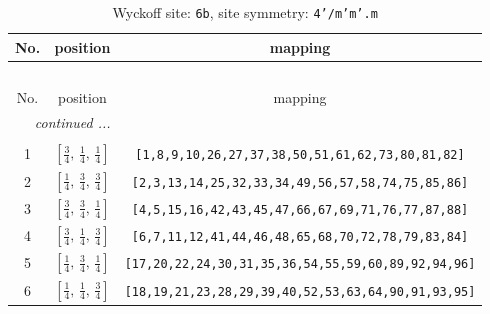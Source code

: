 \documentclass[fleqn,8pt]{jsarticle}
\begin{document}
\begin{longtable}{ccc}
\caption{Wyckoff site: {\tt 6b}, site symmetry: {\tt 4'/m'm'.m}}
 \\
 \hline \hline
No. & position & mapping \\ \hline \endfirsthead

\multicolumn{2}{l}{\tablename\ \thetable{}} \\
 \hline \hline
No. & position & mapping \\ \hline \endhead

 \hline \hline
\multicolumn{2}{r}{\footnotesize\it continued ...} \\ \endfoot

 \hline \hline
\multicolumn{2}{r}{} \\ \endlastfoot

1 & $\left[ \frac{3}{4},\, \frac{1}{4},\, \frac{1}{4} \right]$ & {\tt [1,8,9,10,26,27,37,38,50,51,61,62,73,80,81,82]} \\ \hline
2 & $\left[ \frac{1}{4},\, \frac{3}{4},\, \frac{3}{4} \right]$ & {\tt [2,3,13,14,25,32,33,34,49,56,57,58,74,75,85,86]} \\ \hline
3 & $\left[ \frac{3}{4},\, \frac{3}{4},\, \frac{1}{4} \right]$ & {\tt [4,5,15,16,42,43,45,47,66,67,69,71,76,77,87,88]} \\ \hline
4 & $\left[ \frac{3}{4},\, \frac{1}{4},\, \frac{3}{4} \right]$ & {\tt [6,7,11,12,41,44,46,48,65,68,70,72,78,79,83,84]} \\ \hline
5 & $\left[ \frac{1}{4},\, \frac{3}{4},\, \frac{1}{4} \right]$ & {\tt [17,20,22,24,30,31,35,36,54,55,59,60,89,92,94,96]} \\ \hline
6 & $\left[ \frac{1}{4},\, \frac{1}{4},\, \frac{3}{4} \right]$ & {\tt [18,19,21,23,28,29,39,40,52,53,63,64,90,91,93,95]} \\
\end{longtable}
\renewcommand{\arraystretch}{1.2}
\end{document}
